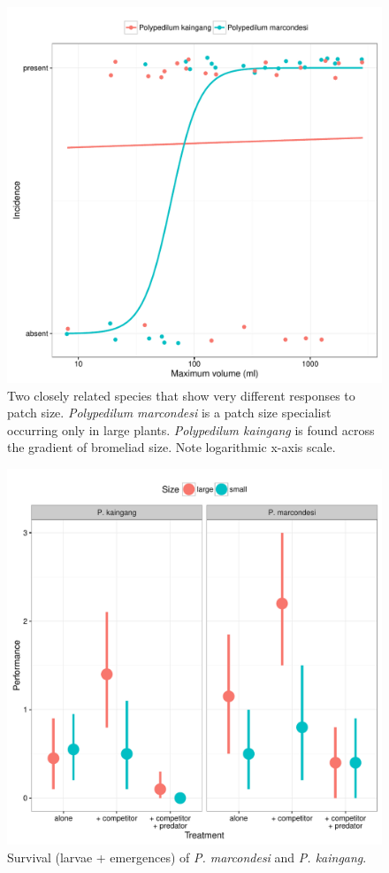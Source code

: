 \begin{figure}[htbp]
\centering
\includegraphics[width=5.5in]{figures/poly_curve.pdf}
\caption{Two closely
related species that show very different responses to patch size.
\emph{Polypedilum marcondesi} is a patch size specialist occurring
only in large plants. \emph{Polypedilum kaingang} is found across the
gradient of bromeliad size. Note logarithmic x-axis scale.}
\end{figure}


\begin{figure}[htbp]
\centering
\includegraphics[width=5.5in]{figures/anova_data.pdf}
\caption{Survival (larvae + emergences) of \emph{P. marcondesi} and
\emph{P. kaingang}.}
\end{figure}

